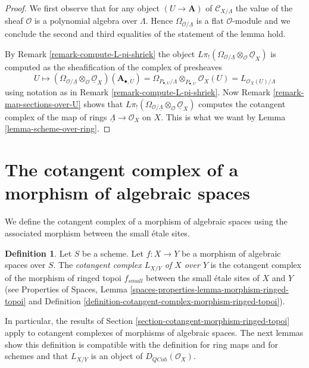 \documentclass{stacks-project}
\theoremstyle{plain}
\theoremstyle{definition}
\newtheorem{definition}[subsection]{Definition}
\theoremstyle{remark}
\numberwithin{equation}{subsection}
\def\QCoh{\mathit{QCoh}}
\begin{document}
\begin{proof}
We first observe that for any object $(U \to \mathbf{A})$ of
$\mathcal{C}_{X/\Lambda}$
the value of the sheaf $\mathcal{O}$ is a polynomial algebra over $\Lambda$.
Hence $\Omega_{\mathcal{O}/\underline{\Lambda}}$ is a flat $\mathcal{O}$-module
and we conclude the second and third equalities of the statement of the
lemma hold.

\medskip\noindent
By Remark \ref{remark-compute-L-pi-shriek} the object
$L\pi_!(\Omega_{\mathcal{O}/\underline{\Lambda}}
\otimes_\mathcal{O} \underline{\mathcal{O}}_X)$
is computed as the sheafification of the complex of presheaves
$$
U \mapsto
\left(\Omega_{\mathcal{O}/\underline{\Lambda}}
\otimes_\mathcal{O} \underline{\mathcal{O}}_X\right)(\mathbf{A}_{\bullet, U})
=
\Omega_{P_{\bullet, U}/\Lambda} \otimes_{P_{\bullet, U}} \mathcal{O}_X(U) =
L_{\mathcal{O}_X(U)/\Lambda}
$$
using notation as in Remark \ref{remark-compute-L-pi-shriek}.
Now Remark \ref{remark-map-sections-over-U} shows that
$L\pi_!(\Omega_{\mathcal{O}/\underline{\Lambda}}
\otimes_\mathcal{O} \underline{\mathcal{O}}_X)$
computes the cotangent complex of the map of rings
$\underline{\Lambda} \to \mathcal{O}_X$ on $X$.
This is what we want by Lemma \ref{lemma-scheme-over-ring}.
\end{proof}








\section{The cotangent complex of a morphism of algebraic spaces}
\label{section-cotangent-morphism-spaces}

\noindent
We define the cotangent complex of a morphism of algebraic spaces
using the associated morphism between the small \'etale sites.

\begin{definition}
\label{definition-cotangent-morphism-spaces}
Let $S$ be a scheme. Let $f : X \to Y$ be a morphism of algebraic spaces
over $S$. The {\it cotangent complex $L_{X/Y}$ of $X$ over $Y$} is the
cotangent complex of the morphism of ringed topoi $f_{small}$
between the small \'etale sites of $X$ and $Y$
(see
Properties of Spaces, Lemma
\ref{spaces-properties-lemma-morphism-ringed-topoi}
and
Definition \ref{definition-cotangent-complex-morphism-ringed-topoi}).
\end{definition}

\noindent
In particular, the results of
Section \ref{section-cotangent-morphism-ringed-topoi} apply
to cotangent complexes of morphisms of algebraic spaces.
The next lemmas show this definition is compatible with the definition
for ring maps and for schemes and that $L_{X/Y}$ is an
object of $D_\QCoh(\mathcal{O}_X)$.
\end{document}
